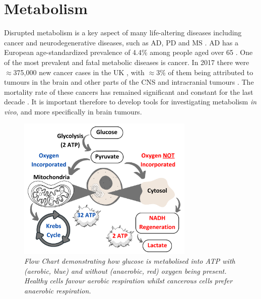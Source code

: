 \section{Metabolism}

Disrupted metabolism is a key aspect of many life-altering diseases including cancer and neurodegenerative diseases, such as \ac{AD}, \ac{PD} and \ac{MS} \cite{Gialleonardo2016TheImaging}. \ac{AD} has a European age-standardized prevalence of 4.4\% among people aged over 65 \cite{Qiu2009EpidemiologyIntervention}. One of the most prevalent and fatal metabolic diseases is cancer. In 2017 there were $\approx$375,000 new cancer cases in the UK \cite{CancerUK}, with $\approx$3\% of them being attributed to tumours in the brain and other parts of the CNS and intracranial tumours \cite{BrainUK}. The mortality rate of these cancers has remained significant and constant for the last decade \cite{BrainUK}. It is important therefore to develop tools for investigating metabolism \textit{in vivo}, and more specifically in brain tumours.

\begin{figure}
    \centering
    \includegraphics[width=0.75\textwidth]{Figures/Intro/Metabolism.png}
    \caption{\textit{Flow Chart demonstrating how glucose is metabolised into \ac{ATP} with (aerobic, blue) and without (anaerobic, red) oxygen being present. Healthy cells favour aerobic respiration whilst cancerous cells prefer anaerobic respiration.}}
    \label{fig:intro:Metabolism}
\end{figure}


